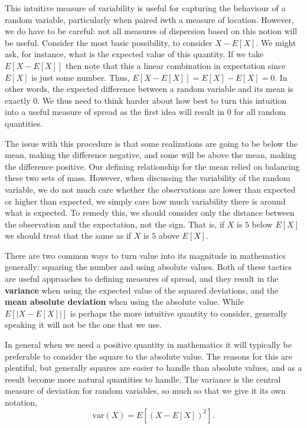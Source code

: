 \documentclass[
  letterpaper,
  DIV=11,
  numbers=noendperiod]{scrreprt}
\begin{document}
This intuitive measure of variability is useful for capturing the
behaviour of a random variable, particularly when paired iwth a measure
of location. However, we do have to be careful: not all measures of
dispersion based on this notion will be useful. Consider the most basic
possibility, to consider \(X - E[X]\). We might ask, for instance, what
is the expected value of this quantity. If we take \(E[X - E[X]]\) then
note that this a linear combination in expectation since \(E[X]\) is
just some number. Thus, \(E[X-E[X]] = E[X] - E[X] = 0\). In other words,
the expected difference between a random variable and its mean is
exactly \(0\). We thus need to think harder about how best to turn this
intuition into a useful measure of spread as the first idea will result
in \(0\) for all random quantities.

The issue with this procedure is that some realizations are going to be
below the mean, making the difference negative, and some will be above
the mean, making the difference positive. Our defining relationship for
the mean relied on balancing these two sets of mass. However, when
discussing the variability of the random variable, we do not much care
whether the observations are lower than expected or higher than
expected, we simply care how much variability there is around what is
expected. To remedy this, we should consider only the distance between
the observation and the expectation, not the sign. That is, if \(X\) is
\(5\) below \(E[X]\) we should treat that the same as if \(X\) is \(5\)
above \(E[X]\).

There are two common ways to turn value into its magnitude in
mathematics generally: squaring the number and using absolute values.
Both of these tactics are useful approaches to defining measures of
spread, and they result in the \textbf{variance} when using the expected
value of the squared deviations, and the \textbf{mean absolute
deviation} when using the absolute value. While \(E[|X-E[X]|]\) is
perhaps the more intuitive quantity to consider, generally speaking it
will not be the one that we use.

In general when we need a positive quantity in mathematics it will
typically be preferable to consider the square to the absolute value.
The reasons for this are plentiful, but generally squares are easier to
handle than absolute values, and as a result become more natural
quantities to handle. The variance is the central measure of deviation
for random variables, so much so that we give it its own notation,
\[\text{var}(X) = E[(X-E[X])^2].\]
\end{document}
